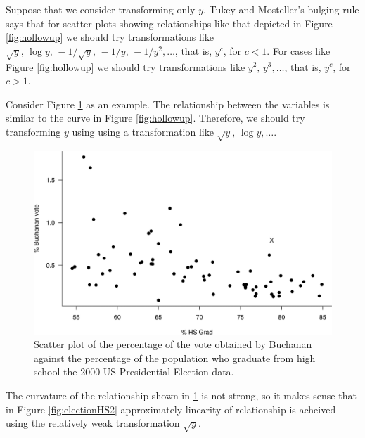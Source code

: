 \documentclass[
  british,
]{book}
\begin{document}
Suppose that we consider transforming only \(y\). Tukey and Mosteller's bulging rule says that for scatter plots showing relationships like that depicted in Figure \ref{fig:hollowup} we should try transformations like \(\sqrt{y}, \, \log y, \,-1/\sqrt{y}, \, -1/y, \, -1/y^2, \ldots\), that is, \(y^c\), for \(c < 1\). For cases like Figure \ref{fig:hollowup} we should try transformations like \(y^2, \, y^3, \ldots\), that is, \(y^c\), for \(c > 1\).

Consider Figure \ref{fig:electionHS1} as an example. The relationship between the variables is similar to the curve in Figure \ref{fig:hollowup}. Therefore, we should try transforming \(y\) using using a transformation like \(\sqrt{y}, \, \log y, \ldots\).

\begin{figure}

{\centering \includegraphics[width=0.8\linewidth]{images/election_HS1} 

}

\caption{Scatter plot of the percentage of the vote obtained by Buchanan against the percentage of the population who graduate from high school the 2000 US Presidential Election data.}\label{fig:electionHS1}
\end{figure}
\FloatBarrier

The curvature of the relationship shown in \ref{fig:electionHS1} is not strong, so it makes sense that in Figure \ref{fig:electionHS2} approximately linearity of relationship is acheived using the relatively weak transformation \(\sqrt{y}\).
\end{document}
